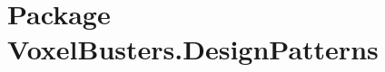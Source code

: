 \hypertarget{namespace_voxel_busters_1_1_design_patterns}{}\section{Package Voxel\+Busters.\+Design\+Patterns}
\label{namespace_voxel_busters_1_1_design_patterns}
